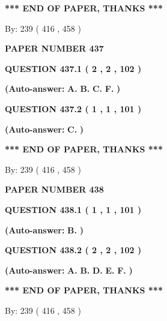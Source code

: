 \documentclass[12pt]{article}
\begin{document}
 
   
   
\vspace{1.0in} 
{\textbf{\large{ *** END OF PAPER, THANKS *** }}} 
   
   
\hspace{1.0in} By: 
 239 ( 416 ,  458 )
   
   
   
   
\newpage 
\setcounter{page}{ 
   437001 } 
   
   
 {\textbf{ \Large{ PAPER NUMBER  437  }}}
   
   
  
  
{\textbf{\large{QUESTION
437.1 
 ( 2 , 2 , 102 )
}}}
 
 
{\textbf{(Auto-answer:}}
{\textbf{\large{
A.}}}
{\textbf{\large{
B.}}}
{\textbf{\large{
C.}}}
{\textbf{\large{
F.}}}
{\textbf{)}}
 
 
  
  
{\textbf{\large{QUESTION
437.2 
 ( 1 , 1 , 101 )
}}}
 
 
{\textbf{(Auto-answer:}}
{\textbf{\large{
C.}}}
{\textbf{)}}
 
 
   
   
\vspace{1.0in} 
{\textbf{\large{ *** END OF PAPER, THANKS *** }}} 
   
   
\hspace{1.0in} By: 
 239 ( 416 ,  458 )
   
   
   
   
\newpage 
\setcounter{page}{ 
   438001 } 
   
   
 {\textbf{ \Large{ PAPER NUMBER  438  }}}
   
   
  
  
{\textbf{\large{QUESTION
438.1 
 ( 1 , 1 , 101 )
}}}
 
 
{\textbf{(Auto-answer:}}
{\textbf{\large{
B.}}}
{\textbf{)}}
 
 
  
  
{\textbf{\large{QUESTION
438.2 
 ( 2 , 2 , 102 )
}}}
 
 
{\textbf{(Auto-answer:}}
{\textbf{\large{
A.}}}
{\textbf{\large{
B.}}}
{\textbf{\large{
D.}}}
{\textbf{\large{
E.}}}
{\textbf{\large{
F.}}}
{\textbf{)}}
 
 
   
   
\vspace{1.0in} 
{\textbf{\large{ *** END OF PAPER, THANKS *** }}} 
   
   
\hspace{1.0in} By: 
 239 ( 416 ,  458 )
   
\end{document}
